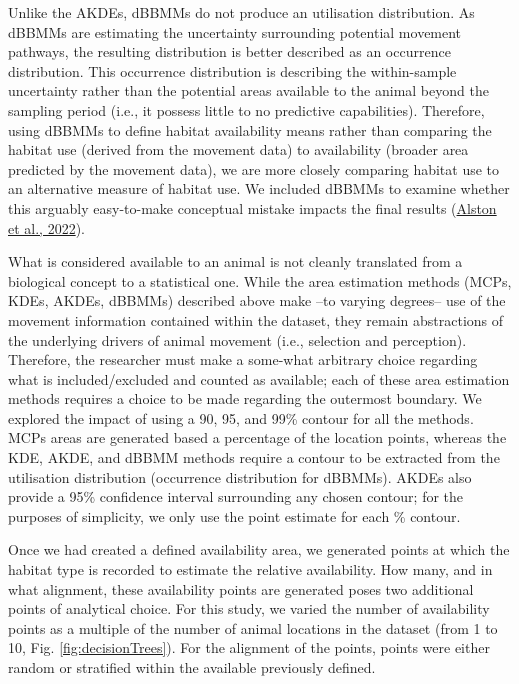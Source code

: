 \documentclass[10pt,a4paper]{article}
\begin{document}
Unlike the AKDEs, dBBMMs do not produce an utilisation distribution.
As dBBMMs are estimating the uncertainty surrounding potential movement pathways, the resulting distribution is better described as an occurrence distribution.
This occurrence distribution is describing the within-sample uncertainty rather than the potential areas available to the animal beyond the sampling period (i.e., it possess little to no predictive capabilities).
Therefore, using dBBMMs to define habitat availability means rather than comparing the habitat use (derived from the movement data) to availability (broader area predicted by the movement data), we are more closely comparing habitat use to an alternative measure of habitat use.
We included dBBMMs to examine whether this arguably easy-to-make conceptual mistake impacts the final results (\protect\hyperlink{ref-alston_clarifying_2022}{Alston et al., 2022}).

What is considered available to an animal is not cleanly translated from a biological concept to a statistical one.
While the area estimation methods (MCPs, KDEs, AKDEs, dBBMMs) described above make --to varying degrees-- use of the movement information contained within the dataset, they remain abstractions of the underlying drivers of animal movement (i.e., selection and perception).
Therefore, the researcher must make a some-what arbitrary choice regarding what is included/excluded and counted as available; each of these area estimation methods requires a choice to be made regarding the outermost boundary.
We explored the impact of using a 90, 95, and 99\% contour for all the methods.
MCPs areas are generated based a percentage of the location points, whereas the KDE, AKDE, and dBBMM methods require a contour to be extracted from the utilisation distribution (occurrence distribution for dBBMMs).
AKDEs also provide a 95\% confidence interval surrounding any chosen contour; for the purposes of simplicity, we only use the point estimate for each \% contour.

Once we had created a defined availability area, we generated points at which the habitat type is recorded to estimate the relative availability.
How many, and in what alignment, these availability points are generated poses two additional points of analytical choice.
For this study, we varied the number of availability points as a multiple of the number of animal locations in the dataset (from 1 to 10, Fig. \ref{fig:decisionTrees}).
For the alignment of the points, points were either random or stratified within the available previously defined.
\end{document}
